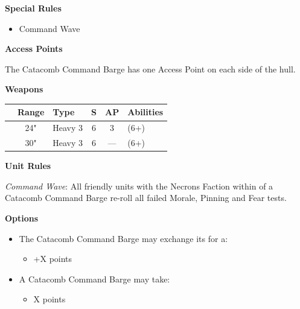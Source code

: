 \begin{minipage}[t]{0.72\textwidth}
\begin{minipage}[t]{0.5\textwidth}
\begin{flushleft}
		\textbf{Special Rules}
		\begin{itemize}
			\item Command Wave
		\end{itemize}
		\end{flushleft}
	\end{minipage}
	
	\vspace*{2em}
	\textbf{Access Points}
	
	The Catacomb Command Barge has one Access Point on each side of the hull.
	
	\vspace*{2em}
	\textbf{Weapons}
	
	\begin{tabular}{L{90 pt} c C{40pt} *{2}{c} >{\raggedright\arraybackslash}p{130pt}}
		& Range & Type & S & AP & Abilities \\
		\hline
		 & 24" & Heavy 3 & 6 & 3 &  (6+) \\
		 & 30" & Heavy 3 & 6 & — &  (6+) \\
	\end{tabular}
	
	\vspace*{2em}
	\textbf{Unit Rules}
	
	\textit{Command Wave}: All friendly units with the Necrons Faction within  of a Catacomb Command Barge re-roll all failed Morale, Pinning and Fear tests.
	
	\vspace*{2em}
	\textbf{Options}
	\begin{itemize}
		\item The Catacomb Command Barge may exchange its  for a:
		\begin{itemize}
			\item {} \dotfill +X points
		\end{itemize}
		\item A Catacomb Command Barge may take:
		\begin{itemize}
			\item {} \dotfill X points
		\end{itemize} 
	\end{itemize}
\end{minipage}



\newpage
\subsubsection[Cryptek Conclave]{}

